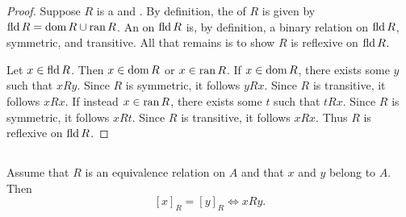 \documentclass{report}
\begin{document}
\begin{proof}

  Suppose $R$ is a  and 
    .
  By definition, the  of $R$ is given by
    $\mathop{\text{fld}}{R} = \mathop{\text{dom}}{R} \cup \mathop{\text{ran}}{R}$.
  An  on $\mathop{\text{fld}}{R}$ is, by definition, a
    binary relation  on $\mathop{\text{fld}}{R}$, symmetric, and
    transitive.
  All that remains is to show $R$ is reflexive on $\mathop{\text{fld}}{R}$.

  Let $x \in \mathop{\text{fld}}{R}$.
  Then $x \in \mathop{\text{dom}}{R}$ or $x \in \mathop{\text{ran}}{R}$.
  If $x \in \mathop{\text{dom}}{R}$, there exists some $y$ such that $xRy$.
  Since $R$ is symmetric, it follows $yRx$.
  Since $R$ is transitive, it follows $xRx$.
  If instead $x \in \mathop{\text{ran}}{R}$, there exists some $t$ such that $tRx$.
  Since $R$ is symmetric, it follows $xRt$.
  Since $R$ is transitive, it follows $xRx$.
  Thus $R$ is reflexive on $\mathop{\text{fld}}{R}$.

\end{proof}

\subsection{}%
\label{sub:lemma-3n}

\begin{lemma}[3N]

  Assume that $R$ is an equivalence relation on $A$ and that $x$ and $y$ belong
    to $A$.
  Then $$[x]_R = [y]_R \iff xRy.$$

\end{lemma}
\end{document}
